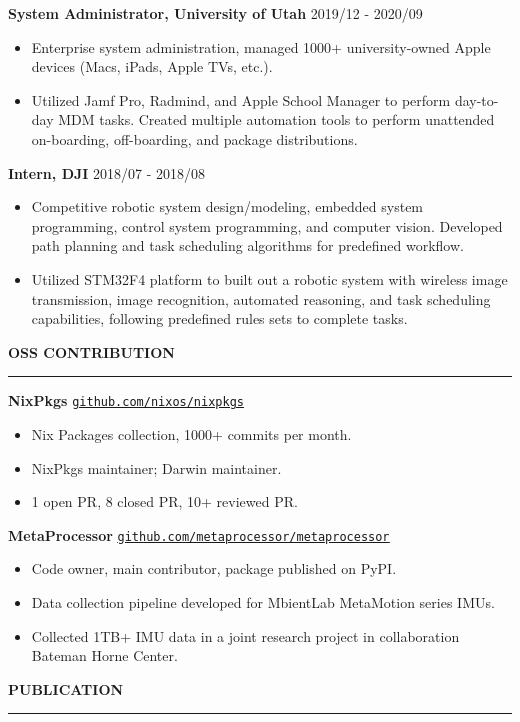 \documentclass{letter}
\newcommand{\link}[2]{
\href{#1}{\underline{\texttt{#2}}}
}
\newcommand{\section}[1]{
\Large{\textbf{\MakeUppercase{#1}}}

\vspace{-0.3in}
\rule{\textwidth}{0.25mm}
\vspace{-0.35in}
}
\newcommand{\experience}[3]{
\large{\textbf{#1} \hfill \normalsize{#2}}

\vspace{-2.5mm}

\normalsize{#3}

\vspace{-2.5mm}
}
\begin{document}
\experience{System Administrator, University of Utah}{2019/12 - 2020/09} {
\begin{itemize}
\item Enterprise system administration, managed 1000+ university-owned Apple devices (Macs, iPads, Apple TVs, etc.).
\item Utilized Jamf Pro, Radmind, and Apple School Manager to perform day-to-day MDM tasks. Created multiple automation tools to perform unattended on-boarding, off-boarding, and package distributions.
\end{itemize}
}

\experience{Intern, DJI}{2018/07 - 2018/08} {
\begin{itemize}
\item Competitive robotic system design/modeling, embedded system programming, control system programming, and computer vision. Developed path planning and task scheduling algorithms for predefined workflow.
\item Utilized STM32F4 platform to built out a robotic system with wireless image transmission, image recognition, automated reasoning, and task scheduling capabilities, following predefined rules sets to complete tasks.
\end{itemize}
}

\section{OSS Contribution}

\experience{NixPkgs}
{\link{https://github.com/nixos/nixpkgs}{github.com/nixos/nixpkgs}} {
\begin{itemize}
\item Nix Packages collection, 1000+ commits per month.
\item NixPkgs maintainer; Darwin maintainer.
\item 1 open PR, 8 closed PR, 10+ reviewed PR.
\end{itemize}
}

\experience{MetaProcessor}
{\link{https://github.com/metaprocessor/metaprocessor}{github.com/metaprocessor/metaprocessor}} {
\begin{itemize}
\item Code owner, main contributor, package published on PyPI.
\item Data collection pipeline developed for MbientLab MetaMotion series IMUs.
\item Collected 1TB+ IMU data in a joint research project in collaboration Bateman Horne Center. 
\end{itemize}
}

\section{Publication}

\normalsize{
\nocite{*}


}
\end{document}

